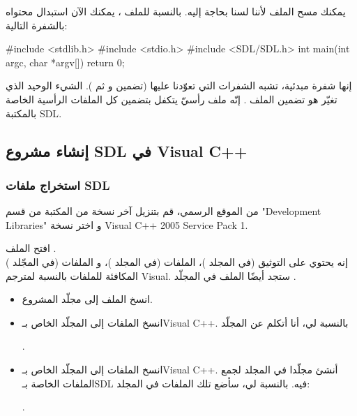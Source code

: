يمكنك مسح الملف 
لأننا لسنا بحاجة إليه. بالنسبة للملف 
، 
يمكنك الآن استبدال محتواه بالشفرة التالية:

\begin{Csource}
#include <stdlib.h>
#include <stdio.h>
#include <SDL/SDL.h>
int main(int argc, char *argv[])
{
	return 0;
}
\end{Csource}
إنها شفرة مبدئية، تشبه الشفرات التي تعوّدنا عليها (تضمين
و
ثم 
).
الشيء الوحيد الذي تغيّر هو تضمين الملف
.
إنّه ملف رأسيّ يتكفل بتضمين كل الملفات الرأسية الخاصة بالمكتبة 
\textenglish{SDL}.

\subsection{إنشاء مشروع \textenglish{SDL} في \textenglish{Visual C++}}

\subsubsection{استخراج ملفات \textenglish{SDL}}

من الموقع الرسمي، قم بتنزيل آخر نسخة من المكتبة من قسم
"\textenglish{Development Libraries}"
و اختر نسخة
\textenglish{Visual C++ 2005 Service Pack 1}.

افتح الملف
.\\
إنه يحتوي  على التوثيق (في المجلد
)،
 الملفات
(في المجلد
)، 
و الملفات
(في المجّلد
)
المكافئة للملفات
بالنسبة لمترجم
\textenglish{Visual}.
ستجد أيضًا الملف 
في المجلّد
.

\begin{itemize}
	\item انسخ الملف
	إلى مجلّد المشروع.
	\item انسخ الملفات
	إلى المجلّد 
	الخاص بـ\textenglish{Visual C++}.
	بالنسبة لي، أنا أتكلم عن المجلّد
	
	.
	
	\item انسخ الملفات
	إلى المجلّد
	الخاص بـ\textenglish{Visual C++}.
	أنشئ مجلّدا
	في المجلد
	لجمع الملفات
	الخاصة بـ\textenglish{SDL}
	فيه. بالنسبة لي، سأضع تلك الملفات في المجلد:
	
	.

\end{itemize}

